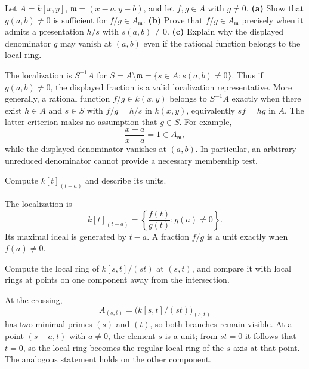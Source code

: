 \begin{problem}[CP-V-0076]
\label{prob:cp-v-0076}
Let $A=k[x,y]$, $\mathfrak m=(x-a,y-b)$, and let $f,g\in A$ with $g\ne0$.
\textbf{(a)} Show that $g(a,b)\ne0$ is sufficient for $f/g\in A_{\mathfrak m}$.
\textbf{(b)} Prove that $f/g\in A_{\mathfrak m}$ precisely when it
admits a presentation $h/s$ with $s(a,b)\ne0$.
\textbf{(c)} Explain why the displayed denominator $g$ may vanish
at $(a,b)$ even if the rational function belongs to the local ring.
\end{problem}

\begin{solution}
The localization is $S^{-1}A$ for
$S=A\setminus\mathfrak m=\{s\in A:s(a,b)\ne0\}$.
Thus if $g(a,b)\ne0$, the displayed fraction is a valid localization
representative. More generally, a rational function $f/g\in k(x,y)$
belongs to $S^{-1}A$ exactly when there exist $h\in A$ and $s\in S$
with $f/g=h/s$ in $k(x,y)$, equivalently $sf=hg$ in $A$.
The latter criterion makes no assumption that $g\in S$.
For example,
\[
\frac{x-a}{x-a}=1\in A_{\mathfrak m},
\]
while the displayed denominator vanishes at $(a,b)$.
In particular, an arbitrary unreduced denominator cannot provide a
necessary membership test.
\end{solution}


\begin{problem}[CP-V-0099]
\label{prob:cp-v-0099}
Compute \(k[t]_{(t-a)}\) and describe its units.
\end{problem}

\begin{solution}
The localization is
\[
k[t]_{(t-a)}
=
\left\{\frac{f(t)}{g(t)}:g(a)\ne0\right\}.
\]
Its maximal ideal is generated by \(t-a\). A fraction \(f/g\) is a unit exactly when \(f(a)\ne0\).
\end{solution}


\begin{problem}[CP-V-0100]
\label{prob:cp-v-0100}
Compute the local ring of \(k[s,t]/(st)\) at \((s,t)\), and compare it with local rings at points on one component away from the intersection.
\end{problem}

\begin{solution}
At the crossing,
\[
A_{(s,t)}=\bigl(k[s,t]/(st)\bigr)_{(s,t)}
\]
has two minimal primes \((s)\) and \((t)\), so both branches remain visible. At a point \((s-a,t)\) with \(a\ne0\), the element \(s\) is a unit; from \(st=0\) it follows that \(t=0\), so the local ring becomes the regular local ring of the \(s\)-axis at that point. The analogous statement holds on the other component.
\end{solution}



